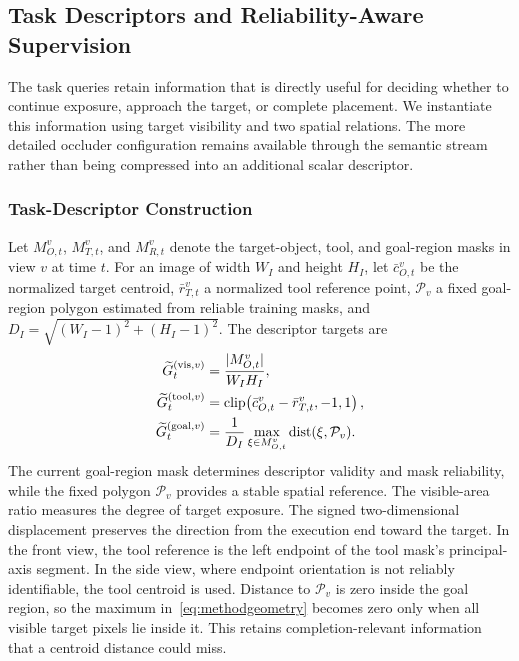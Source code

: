 \subsection{Task Descriptors and Reliability-Aware Supervision}
\label{sec:methodrelations}
The task queries retain information that is directly useful for deciding whether to continue exposure, approach the target, or complete placement.
We instantiate this information using target visibility and two spatial relations.
The more detailed occluder configuration remains available through the semantic stream rather than being compressed into an additional scalar descriptor.

\subsubsection{Task-Descriptor Construction}
Let $M_{O,t}^v$, $M_{T,t}^v$, and $M_{R,t}^v$ denote the target-object, tool, and goal-region masks in view $v$ at time $t$.
For an image of width $W_I$ and height $H_I$, let $\bar c_{O,t}^v$ be the normalized target centroid, $\bar r_{T,t}^v$ a normalized tool reference point, $\mathcal P_v$ a fixed goal-region polygon estimated from reliable training masks, and $D_I=\sqrt{(W_I-1)^2+(H_I-1)^2}$.
The descriptor targets are
\begin{equation}
 \begin{aligned}
 \widetilde G_{t}^{(\mathrm{vis},v)}
 &=\frac{|M_{O,t}^v|}{W_IH_I},\\
 \widetilde G_{t}^{(\mathrm{tool},v)}
 &=\operatorname{clip}\!\left(\bar c_{O,t}^v-\bar r_{T,t}^v,-1,1\right),\\
 \widetilde G_{t}^{(\mathrm{goal},v)}
 &=\frac{1}{D_I}\max_{\xi\in M_{O,t}^v}
   \operatorname{dist}(\xi,\mathcal P_v).
 \end{aligned}
 \label{eq:methodgeometry}
\end{equation}
The current goal-region mask determines descriptor validity and mask reliability, while the fixed polygon $\mathcal P_v$ provides a stable spatial reference.
The visible-area ratio measures the degree of target exposure.
The signed two-dimensional displacement preserves the direction from the execution end toward the target.
In the front view, the tool reference is the left endpoint of the tool mask's principal-axis segment.
In the side view, where endpoint orientation is not reliably identifiable, the tool centroid is used.
Distance to $\mathcal P_v$ is zero inside the goal region, so the maximum in~\eqref{eq:methodgeometry} becomes zero only when all visible target pixels lie inside it.
This retains completion-relevant information that a centroid distance could miss.


